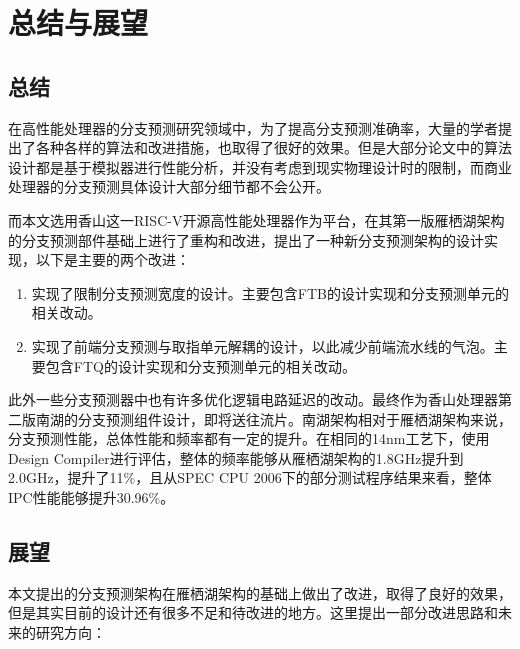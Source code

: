 
\chapter{总结与展望}

\section{总结}

在高性能处理器的分支预测研究领域中，为了提高分支预测准确率，大量的学者提出了各种各样的算法和改进措施，也取得了很好的效果。但是大部分论文中的算法设计都是基于模拟器进行性能分析，并没有考虑到现实物理设计时的限制，而商业处理器的分支预测具体设计大部分细节都不会公开。

而本文选用香山这一RISC-V开源高性能处理器作为平台，在其第一版雁栖湖架构的分支预测部件基础上进行了重构和改进，提出了一种新分支预测架构的设计实现，以下是主要的两个改进：

\begin{enumerate}
    \item 实现了限制分支预测宽度的设计。主要包含FTB的设计实现和分支预测单元的相关改动。
    \item 实现了前端分支预测与取指单元解耦的设计，以此减少前端流水线的气泡。主要包含FTQ的设计实现和分支预测单元的相关改动。
\end{enumerate}

此外一些分支预测器中也有许多优化逻辑电路延迟的改动。最终作为香山处理器第二版南湖的分支预测组件设计，即将送往流片。南湖架构相对于雁栖湖架构来说，分支预测性能，总体性能和频率都有一定的提升。在相同的14nm工艺下，使用Design Compiler进行评估，整体的频率能够从雁栖湖架构的1.8GHz提升到2.0GHz，提升了11\%，且从SPEC CPU 2006下的部分测试程序结果来看，整体IPC性能能够提升30.96\%。

\section{展望}

本文提出的分支预测架构在雁栖湖架构的基础上做出了改进，取得了良好的效果，但是其实目前的设计还有很多不足和待改进的地方。这里提出一部分改进思路和未来的研究方向：

